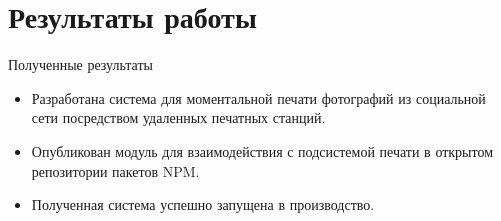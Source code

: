 \documentclass[utf-8]{beamer}
\begin{document}
\section{Результаты работы}
\begin{frame}{Полученные результаты}
  \begin{itemize}
    \item Разработана система для моментальной печати фотографий из социальной сети посредством
      удаленных печатных станций.\\[0.4cm]

    \item Опубликован модуль для взаимодействия с подсистемой печати в открытом репозитории пакетов
      NPM.\\[0.4cm]

    \item Полученная система успешно запущена в производство.
  \end{itemize}
\end{frame}


%   
%   
\end{document}
